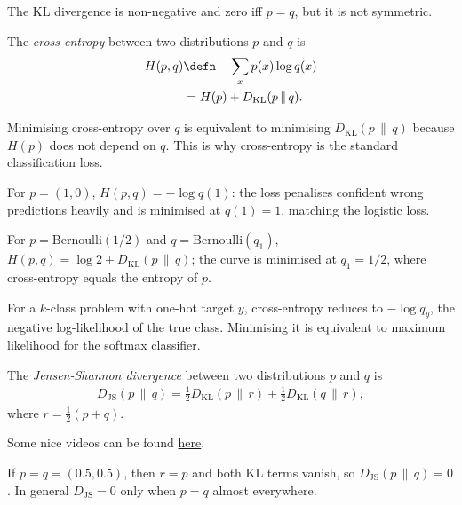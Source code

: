 \documentclass[a4paper, 12pt]{book}
\begin{document}
\begin{proposition}
    The $\mathrm{KL}$ divergence  is non-negative and zero iff $p=q$, but it is not symmetric. 
\end{proposition}

\begin{definition}
    The \emph{cross-entropy} between two distributions $p$ and $q$ is
    \begin{align}
        H(p,q) &\defn -\sum_x p(x)\log q(x)\\
        &=  H(p) + D_{\mathrm{KL}}(p\,\|\,q).
    \end{align}
\end{definition}
Minimising cross-entropy over $q$ is equivalent to minimising
$D_{\mathrm{KL}}(p\,\|\,q)$ because $H(p)$ does not depend on $q$. This is why cross-entropy is the standard classification loss.

\begin{example}
    For $p=(1,0)$, $H(p,q)=-\log q(1)$: the loss penalises confident wrong predictions heavily and is minimised at $q(1)=1$, matching the logistic loss.
\end{example}

\begin{example}
    For $p=\mathrm{Bernoulli}(1/2)$ and $q=\mathrm{Bernoulli}(q_1)$, $H(p,q)=\log 2+D_{\mathrm{KL}}(p\,\|\,q)$; the curve is minimised at $q_1=1/2$, where cross-entropy equals the entropy of $p$.
\end{example}

\begin{example}[Classification]
    For a $k$-class problem with one-hot target $y$, cross-entropy reduces to $-\log q_y$, the negative log-likelihood of the true class. Minimising it is equivalent to maximum likelihood for the softmax classifier.
\end{example}

\begin{definition}
    The \emph{Jensen-Shannon divergence} between two distributions $p$ and $q$ is
    \begin{align}
        D_{\mathrm{JS}}(p\,\|\,q) = \frac{1}{2}D_{\mathrm{KL}}(p\,\|\,r) + \frac{1}{2}D_{\mathrm{KL}}(q\,\|\,r),
    \end{align}
    where $r = \frac{1}{2}(p + q)$.
\end{definition}
Some nice videos can be found \href{https://www.youtube.com/watch?v=KHVR587oW8I}{here}.

\begin{example}
    If $p=q=(0.5,0.5)$, then $r=p$ and both KL terms vanish, so $D_{\mathrm{JS}}(p\,\|\,q)=0$. In general $D_{\mathrm{JS}}=0$ only when $p=q$ almost everywhere.
\end{example}
\end{document}
